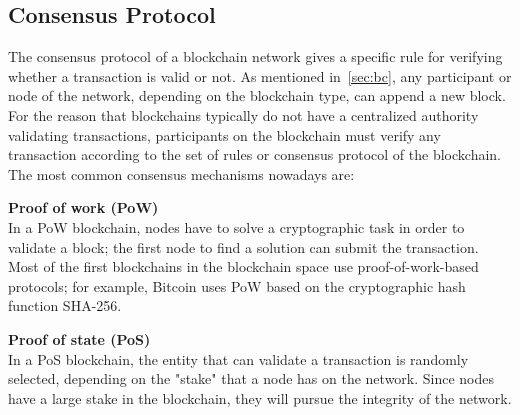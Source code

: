 \documentclass[11pt,a4paper]{report}
\begin{document}
\subsection{Consensus Protocol}\label{sec:cp}
The consensus protocol\cite{article:bc} of a blockchain network gives a specific rule for verifying whether a transaction is valid or not. As mentioned in~\ref{sec:bc}, any participant or node of the network, depending on the blockchain type, can append a new block. For the reason that blockchains typically do not have a centralized authority validating transactions, participants on the blockchain must verify any transaction according to the set of rules or consensus protocol of the blockchain. The most common consensus mechanisms nowadays are:
\begin{description}		
	\item \textbf{Proof of work (PoW)}\\	In a PoW blockchain, nodes have to solve a cryptographic task in order to validate a block; the first node to find a solution can submit the transaction. Most of the first blockchains in the blockchain space use proof-of-work-based protocols; for example, Bitcoin uses PoW based on the cryptographic hash function SHA-256.
	\item \textbf{Proof of state (PoS)}\\	In a PoS blockchain, the entity that can validate a transaction is randomly selected, depending on the "stake" that a node has on the network. Since nodes have a large stake in the blockchain, they will pursue the integrity of the network. 	
\end{description}
\end{document}
